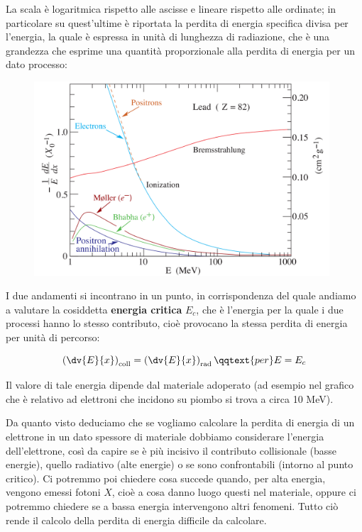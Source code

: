 La scala è logaritmica rispetto alle ascisse e lineare rispetto alle ordinate; in particolare su quest'ultime è riportata la perdita di energia specifica divisa per l'energia, la quale è espressa in unità di lunghezza di radiazione, che è una grandezza che esprime una quantità proporzionale alla perdita di energia per un dato processo:

\begin{figure}[H]
    \centering
    \includegraphics[width=11cm]{immagini/perdita_energia_elettroni.png}
\end{figure}

I due andamenti si incontrano in un punto, in corrispondenza del quale andiamo a valutare la cosiddetta \textbf{energia critica} $E_c$, che è l'energia per la quale i due processi hanno lo stesso contributo, cioè provocano la stessa perdita di energia per unità di percorso:

\begin{equation*}
    \left(\dv{E}{x}\right)_{\rm coll}
    =\left(\dv{E}{x}\right)_{\rm rad}
    \qqtext{per}
    E=E_c
\end{equation*}

Il valore di tale energia dipende dal materiale adoperato (ad esempio nel grafico che è relativo ad elettroni che incidono su piombo si trova a circa 10 MeV).

Da quanto visto deduciamo che se vogliamo calcolare la perdita di energia di un elettrone in un dato spessore di materiale dobbiamo considerare l'energia dell'elettrone, così da capire se è più incisivo il contributo collisionale (basse energie), quello radiativo (alte energie) o se sono confrontabili (intorno al punto critico). Ci potremmo poi chiedere cosa succede quando, per alta energia, vengono emessi fotoni $X$, cioè a cosa danno luogo questi nel materiale, oppure ci potremmo chiedere se a bassa energia intervengono altri fenomeni. Tutto ciò rende il calcolo della perdita di energia difficile da calcolare.

